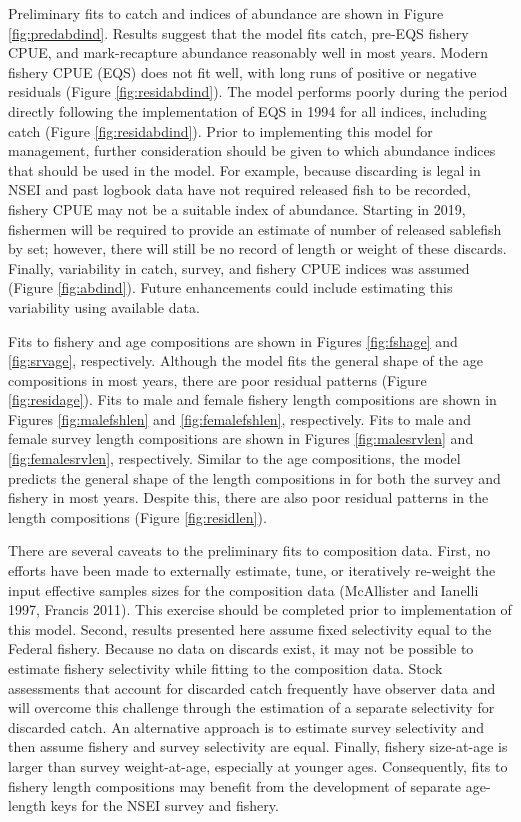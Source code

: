 \documentclass[]{article}
\begin{document}
Preliminary fits to catch and indices of abundance are shown in Figure
\ref{fig:predabdind}. Results suggest that the model fits catch, pre-EQS
fishery CPUE, and mark-recapture abundance reasonably well in most
years. Modern fishery CPUE (EQS) does not fit well, with long runs of
positive or negative residuals (Figure \ref{fig:residabdind}). The model
performs poorly during the period directly following the implementation
of EQS in 1994 for all indices, including catch (Figure
\ref{fig:residabdind}). Prior to implementing this model for management,
further consideration should be given to which abundance indices that
should be used in the model. For example, because discarding is legal in
NSEI and past logbook data have not required released fish to be
recorded, fishery CPUE may not be a suitable index of abundance.
Starting in 2019, fishermen will be required to provide an estimate of
number of released sablefish by set; however, there will still be no
record of length or weight of these discards. Finally, variability in
catch, survey, and fishery CPUE indices was assumed (Figure
\ref{fig:abdind}). Future enhancements could include estimating this
variability using available data.

Fits to fishery and age compositions are shown in Figures
\ref{fig:fshage} and \ref{fig:srvage}, respectively. Although the model
fits the general shape of the age compositions in most years, there are
poor residual patterns (Figure \ref{fig:residage}). Fits to male and
female fishery length compositions are shown in Figures
\ref{fig:malefshlen} and \ref{fig:femalefshlen}, respectively. Fits to
male and female survey length compositions are shown in Figures
\ref{fig:malesrvlen} and \ref{fig:femalesrvlen}, respectively. Similar
to the age compositions, the model predicts the general shape of the
length compositions in for both the survey and fishery in most years.
Despite this, there are also poor residual patterns in the length
compositions (Figure \ref{fig:residlen}).

There are several caveats to the preliminary fits to composition data.
First, no efforts have been made to externally estimate, tune, or
iteratively re-weight the input effective samples sizes for the
composition data (McAllister and Ianelli 1997, Francis 2011). This
exercise should be completed prior to implementation of this model.
Second, results presented here assume fixed selectivity equal to the
Federal fishery. Because no data on discards exist, it may not be
possible to estimate fishery selectivity while fitting to the
composition data. Stock assessments that account for discarded catch
frequently have observer data and will overcome this challenge through
the estimation of a separate selectivity for discarded catch. An
alternative approach is to estimate survey selectivity and then assume
fishery and survey selectivity are equal. Finally, fishery size-at-age
is larger than survey weight-at-age, especially at younger ages.
Consequently, fits to fishery length compositions may benefit from the
development of separate age-length keys for the NSEI survey and fishery.
\end{document}
